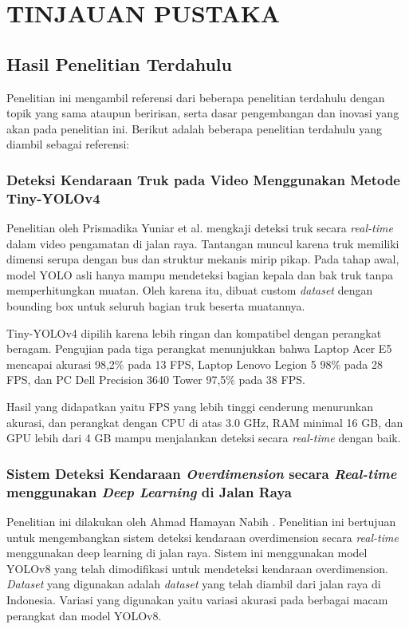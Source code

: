 \chapter{TINJAUAN PUSTAKA}
\label{chap:tinjauanpustaka}


\section{Hasil Penelitian Terdahulu}
\label{sec:hasilpenelitianterdahulu}
Penelitian ini mengambil referensi dari beberapa penelitian terdahulu dengan topik yang sama ataupun beririsan, serta dasar pengembangan dan inovasi yang akan pada penelitian ini. Berikut adalah beberapa penelitian terdahulu yang diambil sebagai referensi:

\subsection{Deteksi Kendaraan Truk pada Video Menggunakan Metode Tiny-YOLOv4}
\label{subsec:deteksikendaraantrukprismadika}
Penelitian oleh Prismadika Yuniar et al. \parencite*{prismadika2023} mengkaji deteksi truk secara \emph{real-time} dalam video pengamatan di jalan raya. Tantangan muncul karena truk memiliki dimensi serupa dengan bus dan struktur mekanis mirip pikap. Pada tahap awal, model YOLO asli hanya mampu mendeteksi bagian kepala dan bak truk tanpa memperhitungkan muatan. Oleh karena itu, dibuat custom \emph{dataset} dengan bounding box untuk seluruh bagian truk beserta muatannya.

Tiny-YOLOv4 dipilih karena lebih ringan dan kompatibel dengan perangkat beragam. Pengujian pada tiga perangkat menunjukkan bahwa Laptop Acer E5 mencapai akurasi 98,2\% pada 13 FPS, Laptop Lenovo Legion 5 98\% pada 28 FPS, dan PC Dell Precision 3640 Tower 97,5\% pada 38 FPS. 

Hasil yang didapatkan yaitu FPS yang lebih tinggi cenderung menurunkan akurasi, dan perangkat dengan CPU di atas 3.0 GHz, RAM minimal 16 GB, dan GPU lebih dari 4 GB mampu menjalankan deteksi secara \emph{real-time} dengan baik.

\subsection{Sistem Deteksi Kendaraan \emph{Overdimension} secara \emph{Real-time} menggunakan \emph{Deep Learning} di Jalan Raya}
\label{subsec:deteksikendaraanoverdimensionhamayan}
Penelitian ini dilakukan oleh Ahmad Hamayan Nabih \parencite*{hamayan2024}. Penelitian ini bertujuan untuk mengembangkan sistem deteksi kendaraan overdimension secara \emph{real-time} menggunakan deep learning di jalan raya. Sistem ini menggunakan model YOLOv8 yang telah dimodifikasi untuk mendeteksi kendaraan overdimension. \emph{Dataset} yang digunakan adalah \emph{dataset} yang telah diambil dari jalan raya di Indonesia. Variasi yang digunakan yaitu variasi akurasi pada berbagai macam perangkat dan model YOLOv8.

